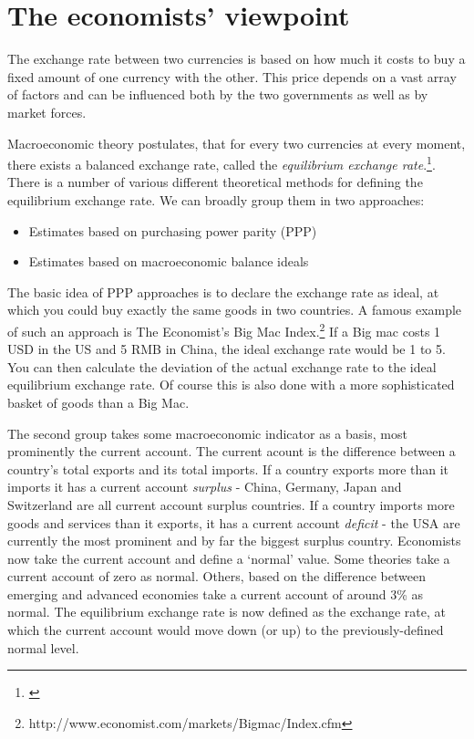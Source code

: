 \section{The economists' viewpoint}

The exchange rate between two currencies is based on how much it 
costs to buy a fixed amount of one currency with the other. This price 
depends on a vast array of factors and can be influenced both by the two 
governments as well as by market forces.  

Macroeconomic theory postulates, that for every two currencies at every 
moment, there exists a balanced exchange rate, called the 
\emph{equilibrium exchange rate}.\footnote{\cite[p.  ?]{Krugman}}. There is a number of various different theoretical methods for defining the equilibrium exchange rate. We can broadly group them in two approaches: 

\begin{itemize}
\item{Estimates based on purchasing power parity (PPP)}
\item{Estimates based on macroeconomic balance ideals}
\end{itemize}

The basic idea of PPP approaches is to declare the exchange rate as ideal, at which you could buy exactly the same goods in two countries. A famous example of such an approach is The Economist's Big Mac Index.\footnote{http://www.economist.com/markets/Bigmac/Index.cfm} If a Big mac costs 1 USD in the US and 5 RMB in China, the ideal exchange rate would be 1 to 5. You can then calculate the deviation of the actual exchange rate to the ideal equilibrium exchange rate. Of course this is also done with a more sophisticated basket of goods than a Big Mac. 

The second group takes some macroeconomic indicator as a basis, most prominently the current account. The current acount is the difference between a country's total exports and its total imports. If a country exports more than it imports it has a current account \emph{surplus} - China, Germany, Japan and Switzerland are all current account surplus countries. If a country imports more goods and services than it exports, it has a current account \emph{deficit} - the USA are currently the most prominent and by far the biggest surplus country. Economists now take the current account and define a `normal' value. Some theories take a current account of zero as normal. Others, based on the difference between emerging and advanced economies take a current account of around 3\% as normal. The equilibrium exchange rate is now defined as the exchange rate, at which the current account would move down (or up) to the previously-defined normal level.

